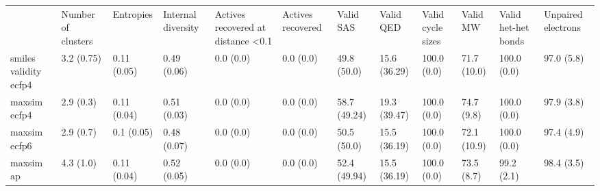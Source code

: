 \begin{tabular}{llllllllllll}
 & Number of clusters & Entropies & Internal diversity & Actives recovered at distance <0.1 & Actives recovered & Valid SAS & Valid QED & Valid cycle sizes & Valid MW & Valid het-het bonds & Unpaired electrons \\
smiles validity ecfp4 & {\cellcolor[HTML]{F1FAFC}} \color[HTML]{000000} 3.2 (0.75) & {\cellcolor[HTML]{E7F6F9}} \color[HTML]{000000} 0.11 (0.05) & {\cellcolor[HTML]{68C3A6}} \color[HTML]{000000} 0.49 (0.06) & {\cellcolor[HTML]{F7FCFD}} \color[HTML]{000000} 0.0 (0.0) & {\cellcolor[HTML]{F7FCFD}} \color[HTML]{000000} 0.0 (0.0) & {\cellcolor[HTML]{67C2A5}} \color[HTML]{000000} 49.8 (50.0) & {\cellcolor[HTML]{DFF3F5}} \color[HTML]{000000} 15.6 (36.29) & {\cellcolor[HTML]{00441B}} \color[HTML]{F1F1F1} 100.0 (0.0) & {\cellcolor[HTML]{2B9452}} \color[HTML]{F1F1F1} 71.7 (10.0) & {\cellcolor[HTML]{00441B}} \color[HTML]{F1F1F1} 100.0 (0.0) & {\cellcolor[HTML]{004D1F}} \color[HTML]{F1F1F1} 97.0 (5.8) \\
maxsim ecfp4 & {\cellcolor[HTML]{F2FAFC}} \color[HTML]{000000} 2.9 (0.3) & {\cellcolor[HTML]{F1FAFC}} \color[HTML]{000000} 0.11 (0.04) & {\cellcolor[HTML]{62C09F}} \color[HTML]{000000} 0.51 (0.03) & {\cellcolor[HTML]{F7FCFD}} \color[HTML]{000000} 0.0 (0.0) & {\cellcolor[HTML]{F7FCFD}} \color[HTML]{000000} 0.0 (0.0) & {\cellcolor[HTML]{4CB484}} \color[HTML]{F1F1F1} 58.7 (49.24) & {\cellcolor[HTML]{D8F0EF}} \color[HTML]{000000} 19.3 (39.47) & {\cellcolor[HTML]{00441B}} \color[HTML]{F1F1F1} 100.0 (0.0) & {\cellcolor[HTML]{238B45}} \color[HTML]{F1F1F1} 74.7 (9.8) & {\cellcolor[HTML]{00441B}} \color[HTML]{F1F1F1} 100.0 (0.0) & {\cellcolor[HTML]{004A1E}} \color[HTML]{F1F1F1} 97.9 (3.8) \\
maxsim ecfp6 & {\cellcolor[HTML]{EFF9FB}} \color[HTML]{000000} 2.9 (0.7) & {\cellcolor[HTML]{E8F6FA}} \color[HTML]{000000} 0.1 (0.05) & {\cellcolor[HTML]{6DC5A9}} \color[HTML]{000000} 0.48 (0.07) & {\cellcolor[HTML]{F7FCFD}} \color[HTML]{000000} 0.0 (0.0) & {\cellcolor[HTML]{F7FCFD}} \color[HTML]{000000} 0.0 (0.0) & {\cellcolor[HTML]{64C1A2}} \color[HTML]{000000} 50.5 (50.0) & {\cellcolor[HTML]{DFF3F5}} \color[HTML]{000000} 15.5 (36.19) & {\cellcolor[HTML]{00441B}} \color[HTML]{F1F1F1} 100.0 (0.0) & {\cellcolor[HTML]{2A9350}} \color[HTML]{F1F1F1} 72.1 (10.9) & {\cellcolor[HTML]{00441B}} \color[HTML]{F1F1F1} 100.0 (0.0) & {\cellcolor[HTML]{004C1E}} \color[HTML]{F1F1F1} 97.4 (4.9) \\
maxsim ap & {\cellcolor[HTML]{F0F9FB}} \color[HTML]{000000} 4.3 (1.0) & {\cellcolor[HTML]{E7F6F9}} \color[HTML]{000000} 0.11 (0.04) & {\cellcolor[HTML]{61BF9E}} \color[HTML]{000000} 0.52 (0.05) & {\cellcolor[HTML]{F7FCFD}} \color[HTML]{000000} 0.0 (0.0) & {\cellcolor[HTML]{F7FCFD}} \color[HTML]{000000} 0.0 (0.0) & {\cellcolor[HTML]{5EBE9B}} \color[HTML]{000000} 52.4 (49.94) & {\cellcolor[HTML]{DFF3F5}} \color[HTML]{000000} 15.5 (36.19) & {\cellcolor[HTML]{00441B}} \color[HTML]{F1F1F1} 100.0 (0.0) & {\cellcolor[HTML]{268F4A}} \color[HTML]{F1F1F1} 73.5 (8.7) & {\cellcolor[HTML]{00471C}} \color[HTML]{F1F1F1} 99.2 (2.1) & {\cellcolor[HTML]{00491D}} \color[HTML]{F1F1F1} 98.4 (3.5) \\

\end{tabular}
